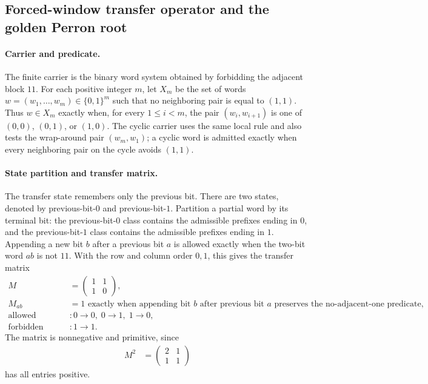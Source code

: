 
\subsection{Forced-window transfer operator and the golden Perron root}
\label{sec:window6-transfer-operator-golden-perron-spectrum}

\paragraph{Carrier and predicate.}
The finite carrier is the binary word system obtained by forbidding the adjacent block $11$. For each positive integer $m$, let $X_m$ be the set of words $w=(w_1,\ldots,w_m)\in\{0,1\}^m$ such that no neighboring pair is equal to $(1,1)$. Thus $w\in X_m$ exactly when, for every $1\leq i<m$, the pair $(w_i,w_{i+1})$ is one of $(0,0)$, $(0,1)$, or $(1,0)$. The cyclic carrier uses the same local rule and also tests the wrap-around pair $(w_m,w_1)$; a cyclic word is admitted exactly when every neighboring pair on the cycle avoids $(1,1)$.

\paragraph{State partition and transfer matrix.}
The transfer state remembers only the previous bit. There are two states, denoted by previous-bit-$0$ and previous-bit-$1$. Partition a partial word by its terminal bit: the previous-bit-$0$ class contains the admissible prefixes ending in $0$, and the previous-bit-$1$ class contains the admissible prefixes ending in $1$. Appending a new bit $b$ after a previous bit $a$ is allowed exactly when the two-bit word $ab$ is not $11$. With the row and column order $0,1$, this gives the transfer matrix
$$
\begin{aligned}
M&=\begin{pmatrix}1&1\\1&0\end{pmatrix},\\
M_{ab}&=1 \text{ exactly when appending bit } b \text{ after previous bit } a \text{ preserves the no-adjacent-one predicate},\\
\text{allowed transitions}&: 0\to 0,\;0\to 1,\;1\to 0,\\
\text{forbidden transition}&: 1\to 1.
\end{aligned}
$$
The matrix is nonnegative and primitive, since
$$
\begin{aligned}
M^2&=\begin{pmatrix}2&1\\1&1\end{pmatrix}
\end{aligned}
$$
has all entries positive.

